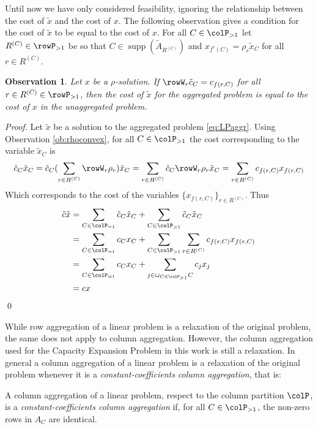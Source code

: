 \documentclass[smallextended,natbib]{svjour3}       %
\newtheorem{observation}[theorem]{Observation}
\DeclareMathOperator{\supp}{supp}
\numberwithin{definition}{section}
\numberwithin{theorem}{section}
\numberwithin{proposition}{section}
\begin{document}
Until now we have only considered feasibility, ignoring the relationship between the cost of \(\tilde{x}\) and the cost of \(x\). The following observation gives a condition for the cost of \(\tilde{x}\) to be equal to the cost of \(x\).
For all \(C \in \colP_{>1}\) let  \(R^{(C)} \in \rowP_{>1}\) be so that \(C \in \supp(\tilde{A}_{R^{(C)}})\) and \(x_{f^r(C)} = \rho_r \tilde{x}_C\) for all \(r \in R^{(C)}\).
\begin{observation}
  \label{ob:costpreserving}
  Let \(x\) be a \(\rho\)-solution. If  \(\rowW_r\tilde{c}_C = c_{f(r,C)}\) for all \(r \in R^{(C)} \in \rowP_{>1}\), then the cost of \(\tilde{x}\) for the aggregated problem 
  is equal to the cost of \(x\) in the unaggregated problem. 
\end{observation}
\begin{proof}
  Let \(\tilde{x}\) be a solution to the aggregated problem \eqref{eq:LPaggr}. Using Observation \ref{ob:rhoconvex}, for all \(C \in \colP_{>1}\) the cost corresponding to the variable \(\tilde{x}_C\) is 
  \[
  \tilde{c}_C\tilde{x}_C = \tilde{c}_C(\sum_{r \in R^{(C)}}\rowW_r\rho_r)\tilde{x}_C = \sum_{r \in R^{(C)}}\tilde{c}_C\rowW_r\rho_r\tilde{x}_C  = \sum_{r \in R^{(C)}}c_{f(r,C)}x_{f(r,C)}
  \]
  Which corresponds to the cost of the variables \(\{x_{f(r,C)}\}_{r \in R^{(C)}}\). Thus
  \begin{align*}
  \tilde{c}\tilde{x} &= \sum_{C \in \colP_{=1}}\tilde{c}_C\tilde{x}_C + \sum_{C \in \colP_{>1}}\tilde{c}_C\tilde{x}_C \\
                    &= \sum_{C \in \colP_{=1}}c_Cx_C + \sum_{C \in \colP_{>1}}\sum_{r \in R^{(C)}}c_{f(r,C)}x_{f(r,C)} \\
                    &= \sum_{C \in \colP_{=1}}c_Cx_C + \sum_{j \in \cup_{C \in \colP_{>1}}C}c_{j}x_{j} \\
                    &= cx
  \end{align*}
\qed
\end{proof}


While row aggregation of a linear problem is a relaxation of the original problem, the same does not apply to column aggregation. However, the column aggregation used for the  Capacity Expansion Problem in this work is still a relaxation. In general a column aggregation of a linear problem is a relaxation of the original problem whenever it is a \emph{constant-coefficients column aggregation}, that is:
\begin{definition}
  A column aggregation of a linear problem, respect to the column partition \(\colP\), is a \emph{constant-coefficients column aggregation} if, for all \(C \in \colP_{>1}\), the non-zero rows in \(A_C\) are identical.
\end{definition}
\end{document}
